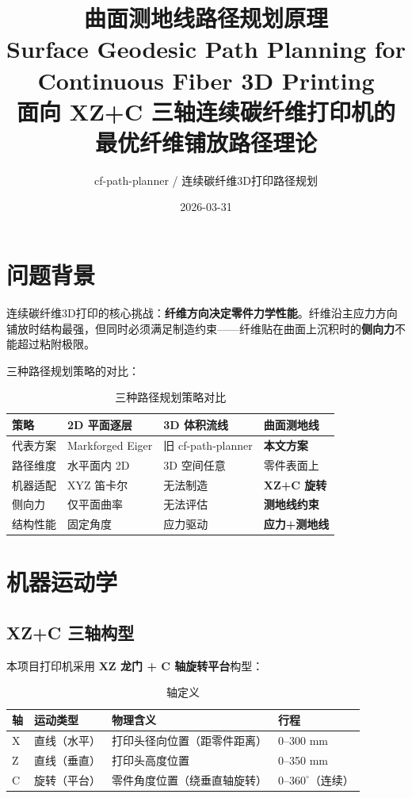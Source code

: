 \documentclass[11pt,a4paper]{article}
\title{\vspace{-1cm}\textsf{\textbf{曲面测地线路径规划原理}}\\
\large Surface Geodesic Path Planning for Continuous Fiber 3D Printing\\[0.3em]
\normalsize 面向 XZ+C 三轴连续碳纤维打印机的最优纤维铺放路径理论}
\author{cf-path-planner / 连续碳纤维3D打印路径规划}
\date{2026-03-31}
\begin{document}
\maketitle
\thispagestyle{fancy}

\tableofcontents
\newpage

\section{问题背景}

连续碳纤维3D打印的核心挑战：\textbf{纤维方向决定零件力学性能}。纤维沿主应力方向铺放时结构最强，但同时必须满足制造约束——纤维贴在曲面上沉积时的\textbf{侧向力}不能超过粘附极限。

三种路径规划策略的对比：

\begin{table}[H]
\centering
\begin{tabularx}{\textwidth}{l X X X}
\toprule
\textbf{策略} & \textbf{2D 平面逐层} & \textbf{3D 体积流线} & \textbf{曲面测地线} \\
\midrule
代表方案 & Markforged Eiger & 旧 cf-path-planner & \textcolor{accent}{\textbf{本文方案}} \\
路径维度 & 水平面内 2D & 3D 空间任意 & 零件表面上 \\
机器适配 & XYZ 笛卡尔 & 无法制造 & \textcolor{pass}{\textbf{XZ+C 旋转}} \\
侧向力 & 仅平面曲率 & 无法评估 & \textcolor{pass}{\textbf{测地线约束}} \\
结构性能 & 固定角度 & 应力驱动 & \textcolor{pass}{\textbf{应力+测地线}} \\
\bottomrule
\end{tabularx}
\caption{三种路径规划策略对比}
\end{table}


\section{机器运动学}

\subsection{XZ+C 三轴构型}

本项目打印机采用 \textbf{XZ 龙门 + C 轴旋转平台}构型：

\begin{table}[H]
\centering
\begin{tabular}{llll}
\toprule
\textbf{轴} & \textbf{运动类型} & \textbf{物理含义} & \textbf{行程} \\
\midrule
X & 直线（水平） & 打印头径向位置（距零件距离） & 0--300 mm \\
Z & 直线（垂直） & 打印头高度位置 & 0--350 mm \\
C & 旋转（平台） & 零件角度位置（绕垂直轴旋转） & 0--$360^\circ$（连续） \\
\bottomrule
\end{tabular}
\caption{轴定义}
\end{table}
\end{document}
